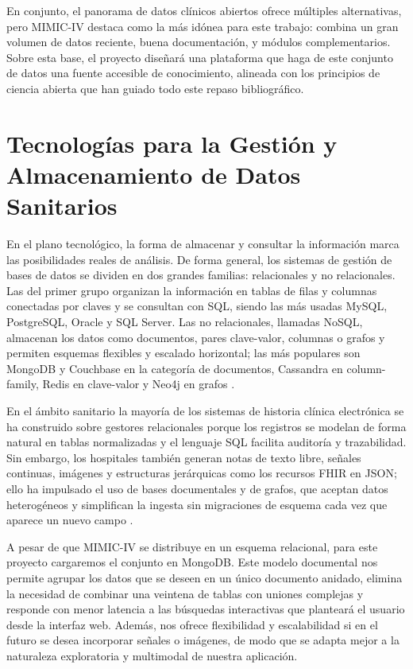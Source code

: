 \newpage
En conjunto, el panorama de datos clínicos abiertos ofrece múltiples alternativas, pero MIMIC-IV destaca como la más idónea para este trabajo: combina un gran volumen de datos reciente, buena documentación, y módulos complementarios. Sobre esta base, el proyecto diseñará una plataforma que haga de este conjunto de datos una fuente accesible de conocimiento, alineada con los principios de ciencia abierta que han guiado todo este repaso bibliográfico.


\section{Tecnologías para la Gestión y Almacenamiento de Datos Sanitarios}




En el plano tecnológico, la forma de almacenar y consultar la información marca las posibilidades reales de análisis. De forma general, los sistemas de gestión de bases de datos se dividen en dos grandes familias: relacionales y no relacionales. Las del primer grupo organizan la información en tablas de filas y columnas conectadas por claves y se consultan con SQL, siendo las más usadas MySQL, PostgreSQL, Oracle y SQL Server.  Las no relacionales, llamadas NoSQL, almacenan los datos como documentos, pares clave-valor, columnas o grafos y permiten esquemas flexibles y escalado horizontal; las más populares son MongoDB y Couchbase en la categoría de documentos, Cassandra en column-family, Redis en clave-valor y Neo4j en grafos \cite{DBEngines2025}.

En el ámbito sanitario la mayoría de los sistemas de historia clínica electrónica se ha construido sobre gestores relacionales porque los registros se modelan de forma natural en tablas normalizadas y el lenguaje SQL facilita auditoría y trazabilidad.  Sin embargo, los hospitales también generan notas de texto libre, señales continuas, imágenes y estructuras jerárquicas como los recursos FHIR en JSON; ello ha impulsado el uso de bases documentales y de grafos, que aceptan datos heterogéneos y simplifican la ingesta sin migraciones de esquema cada vez que aparece un nuevo campo \cite{GAMAL2021103670,MongoFHIR}.

A pesar de que MIMIC-IV se distribuye en un esquema relacional, para este proyecto cargaremos el conjunto en MongoDB. Este modelo documental nos permite agrupar los datos que se deseen en un único documento anidado, elimina la necesidad de combinar una veintena de tablas con uniones complejas y responde con menor latencia a las búsquedas interactivas que planteará el usuario desde la interfaz web.  Además, nos ofrece flexibilidad y escalabilidad si en el futuro se desea incorporar señales o imágenes, de modo que se adapta mejor a la naturaleza exploratoria y multimodal de nuestra aplicación.



